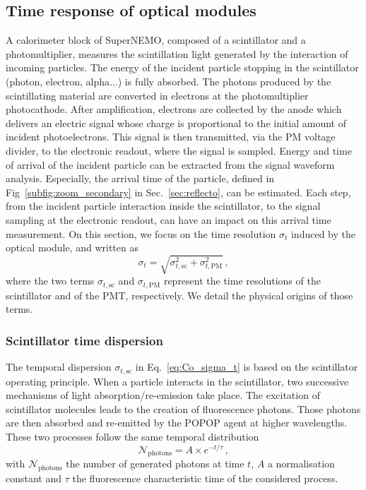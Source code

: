\subsection{Time response of optical modules}
\label{subsec:OMtimeResponse}

A calorimeter block of SuperNEMO, composed of a scintillator and a photomultiplier, measures the scintillation light generated by the interaction of incoming particles.
The energy of the incident particle stopping in the scintillator (photon, electron, alpha...) is fully absorbed.
The photons produced by the scintillating material are converted in electrons at the photomultiplier photocathode.
After amplification, electrons are collected by the anode which delivers an electric signal whose charge is proportional to the initial amount of incident photoelectrons.
This signal is then transmitted, via the PM voltage divider, to the electronic readout, where the signal is sampled.
Energy and time of arrival of the incident particle can be extracted from the signal waveform analysis.
Especially, the arrival time of the particle, defined in Fig~\ref{subfig:zoom_secondary} in Sec.~\ref{sec:reflecto}, can be estimated.
Each step, from the incident particle interaction inside the scintillator, to the signal sampling at the electronic readout, can have an impact on this arrival time measurement.
On this section, we focus on the time resolution $\sigma_{t}$ induced by the optical module, and written as
\begin{equation}
  \sigma_{t}=\sqrt{\sigma_{t,\text{sc}}^{2}+\sigma_{t,\text{PM}}^{2}}\,,
  \label{eq:Co_sigma_t}
\end{equation}
where the two terms $\sigma_{t,\text{sc}}$ and $\sigma_{t,\text{PM}}$ represent the time resolutions of the scintillator and of the PMT, respectively.
We detail the physical origins of those terms.

\subsubsection*{Scintillator time dispersion}
The temporal dispersion $\sigma_{t,\text{sc}}$ in Eq.~\eqref{eq:Co_sigma_t} is based on the  scintillator operating principle.
When a particle interacts in the scintillator, two successive mechanisms of light absorption/re-emission take place.
The excitation of scintillator molecules leads to the creation of fluorescence photons.
Those photons are then absorbed and re-emitted by the POPOP agent at higher wavelengths.
These two processes follow the same temporal distribution
\begin{equation}
\mathcal{N}_{\text{photons}} = A\times e^{-t/\tau}\,,
\label{eq:fluorescence_photons_time}
\end{equation}
with $\mathcal{N}_{\text{photons}}$ the number of generated photons at time $t$, $A$ a normalisation constant and $\tau$ the fluorescence characteristic time of the considered process.

